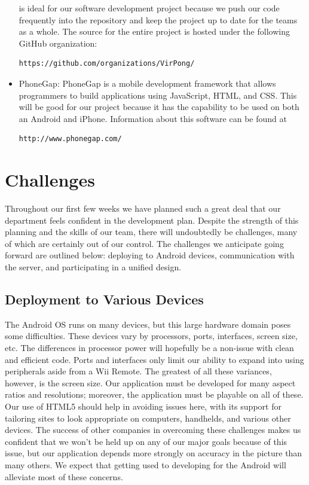 \documentclass[12pt]{article}
\begin{document}
\begin{itemize}
is ideal for our software development project because we push our code
frequently into the repository and keep the project up to date for the teams
as a whole.  The source for the entire project is hosted under the following GitHub
organization:
\begin{verbatim}
https://github.com/organizations/VirPong/
\end{verbatim}
\item PhoneGap: PhoneGap is a mobile development framework that allows
programmers to build applications using JavaScript, HTML, and CSS. This
will be good for our project because it has the capability to be used on both an
Android and iPhone.  Information about this software can be found at
\begin{verbatim}
http://www.phonegap.com/
\end{verbatim}
\end{itemize}




\section{Challenges}


Throughout our first few weeks we have planned such a great deal that our department feels confident in the development plan.  Despite the strength of this planning and the skills of our team, there will undoubtedly be challenges, many of which are certainly out of our control.  The challenges we anticipate going forward are outlined below: deploying to Android devices, communication with the server, and participating in a unified design.

\subsection{Deployment to Various Devices}
The Android OS runs on many devices, but this large hardware domain poses some difficulties.  These devices vary by processors, ports, interfaces, screen size, etc.  The differences in processor power will hopefully be a non-issue with clean and efficient code.  Ports and interfaces only limit our ability to expand into using peripherals aside from a Wii Remote.  The greatest of all these variances, however, is the screen size.  Our application must be developed for many aspect ratios and resolutions; moreover, the application must be playable on all of these.  Our use of HTML5 should help in avoiding issues here, with its support for tailoring sites to look appropriate on computers, handhelds, and various other devices.  The success of other companies in overcoming these challenges makes us confident that we won't be held up on any of our major goals because of this issue, but our application depends more strongly on accuracy in the picture than many others.  We expect that getting used to developing for the Android will alleviate most of these concerns.
\end{document}
